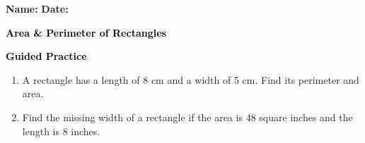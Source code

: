 \documentclass[12pt, letterpaper, fleqn]{article}
\begin{document}
\textbf{Name:} \underline{\hspace{5cm}}
\hfill
\textbf{Date:} \underline{\hspace{3cm}}\\

\begin{tcolorbox}[colback=customteal!20]
    \large\textcolor{black}{\textbf{Area \& Perimeter of Rectangles}}
\end{tcolorbox}
\newpage
\begin{tcolorbox}[colback=customteal!20]
    \large\textcolor{black}{\textbf{Guided Practice}}
\end{tcolorbox}
\begin{enumerate}[itemsep=3.5cm, leftmargin=0.6cm]
\item A rectangle has a length of 8 cm and a width of 5 cm. Find its perimeter and area.
\vspace{3cm}
\item Find the missing width of a rectangle if the area is 48 square inches and the length is 8 inches.
\end{enumerate}
\end{document}
